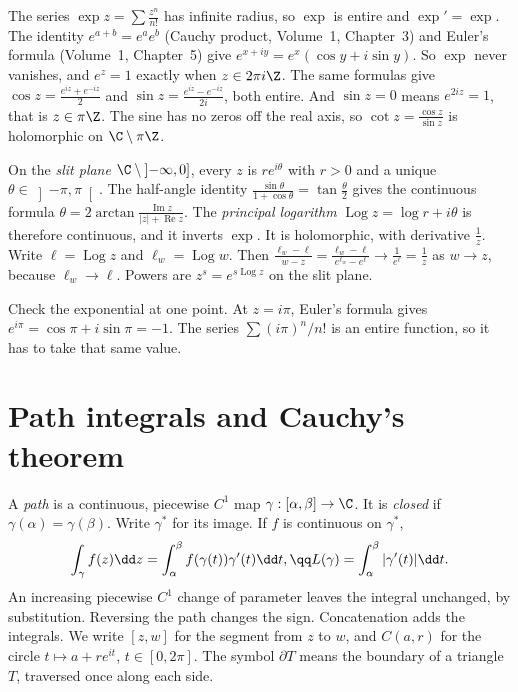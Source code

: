 \begin{example}
The series $\exp z=\sum\frac{z^n}{n!}$ has infinite radius, so $\exp$ is entire and $\exp'=\exp$. The identity $e^{a+b}=e^ae^b$ (Cauchy product, Volume~1, Chapter~3) and Euler's formula (Volume~1, Chapter~5) give $e^{x+iy}=e^x(\cos y+i\sin y)$. So $\exp$ never vanishes, and $e^z=1$ exactly when $z\in2\pi i\Z$. The same formulas give $\cos z=\frac{e^{iz}+e^{-iz}}2$ and $\sin z=\frac{e^{iz}-e^{-iz}}{2i}$, both entire. And $\sin z=0$ means $e^{2iz}=1$, that is $z\in\pi\Z$. The sine has no zeros off the real axis, so $\cot z=\frac{\cos z}{\sin z}$ is holomorphic on $\C\setminus\pi\Z$.

On the \emph{slit plane} $\C\setminus\left]-\infty,0\right]$, every $z$ is $re^{i\theta}$ with $r>0$ and a unique $\theta\in\left]-\pi,\pi\right[$. The half-angle identity $\frac{\sin\theta}{1+\cos\theta}=\tan\frac\theta2$ gives the continuous formula $\theta=2\arctan\frac{\operatorname{Im}z}{|z|+\operatorname{Re}z}$. The \emph{principal logarithm} $\operatorname{Log}z=\log r+i\theta$ is therefore continuous, and it inverts $\exp$. It is holomorphic, with derivative $\frac1z$. Write $\ell=\operatorname{Log}z$ and $\ell_w=\operatorname{Log}w$. Then $\frac{\ell_w-\ell}{w-z}=\frac{\ell_w-\ell}{e^{\ell_w}-e^\ell}\to\frac1{e^\ell}=\frac1z$ as $w\to z$, because $\ell_w\to\ell$. Powers are $z^s=e^{s\operatorname{Log}z}$ on the slit plane.
\end{example}

Check the exponential at one point. At $z=i\pi$, Euler's formula gives $e^{i\pi}=\cos\pi+i\sin\pi=-1$. The series $\sum (i\pi)^n/n!$ is an entire function, so it has to take that same value.

\section{Path integrals and Cauchy's theorem}

A \emph{path} is a continuous, piecewise $C^1$ map $\gamma:[\alpha,\beta]\to\C$. It is \emph{closed} if $\gamma(\alpha)=\gamma(\beta)$. Write $\gamma^*$ for its image. If $f$ is continuous on $\gamma^*$,
\[
\begin{gathered}\int_\gamma f(z)\dd z=\int_\alpha^\beta f(\gamma(t))\gamma'(t)\dd t,\qq L(\gamma)=\int_\alpha^\beta|\gamma'(t)|\dd t.\end{gathered}
\]
An increasing piecewise $C^1$ change of parameter leaves the integral unchanged, by substitution. Reversing the path changes the sign. Concatenation adds the integrals. We write $[z,w]$ for the segment from $z$ to $w$, and $C(a,r)$ for the circle $t\mapsto a+re^{it}$, $t\in[0,2\pi]$. The symbol $\partial T$ means the boundary of a triangle $T$, traversed once along each side.


